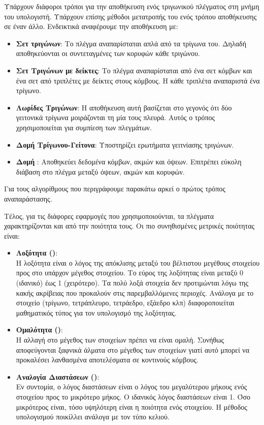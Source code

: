 Υπάρχουν διάφοροι τρόποι για την αποθήκευση ενός τριγωνικού πλέγματος 
στη μνήμη του υπολογιστή. 
Υπάρχουν επίσης μέθοδοι μετατροπής του ενός 
τρόπου αποθήκευσης σε έναν άλλο.
Ενδεικτικά αναφέρουμε την αποθήκευση με:
\begin{itemize}
    \item \textbf{Σετ τριγώνων}: 
    Το πλέγμα αναπαρίσταται απλά από τα τρίγωνα 
    του. 
    Δηλαδή αποθηκεύονται οι συντεταγμένες των κορυφών κάθε τριγώνου.
    \item \textbf{Σετ Τριγώνων με δείκτες}: 
    Το πλέγμα αναπαρίσταται από ένα σετ
    κόμβων και ένα σετ από τριπλέτες με δείκτες στους κόμβους.
    Η κάθε τριπλέτα αναπαριστά ένα τρίγωνο.
    \item \textbf{Λωρίδες Τριγώνων}: 
    Η αποθήκευση αυτή βασίζεται στο γεγονός ότι 
    δύο γειτονικά τρίγωνα μοιράζονται τη μία τους πλευρά. Αυτός 
    ο τρόπος χρησιμοποιείται για συμπίεση των πλεγμάτων.
    \item \textbf{Δομή Τρίγωνου-Γείτονα}: 
    Υποστηρίζει ερωτήματα γειτνίασης τριγώνων.
    \item \textbf{Δομή }: 
    Αποθηκεύει δεδομένα κόμβων, ακμών και όψεων.
    Επιτρέπει εύκολη διάβαση στο πλέγμα μεταξύ όψεων, ακμών και κορυφών.
\end{itemize} 
Για τους αλγορίθμους που περιγράφουμε παρακάτω αρκεί ο πρώτος τρόπος 
αναπαράστασης. 

Τέλος, για τις διάφορες εφαρμογές που χρησιμοποιούνται, τα πλέγματα 
χαρακτηρίζονται και από την ποιότητα τους. Οι πιο συνηθισμένες μετρικές 
ποιότητας είναι:
\begin{itemize}
    \item \textbf{Λοξότητα ()}: \\
    Η λοξότητα είναι ο λόγος της απόκλισης μεταξύ του βέλτιστου μεγέθους
    στοιχείου προς στο υπάρχον μέγεθος στοιχείου. 
    Το εύρος της λοξότητας είναι μεταξύ 0 (ιδανικό) έως 1 (χειρότερο).
    Τα πολύ λοξά στοιχεία δεν προτιμώνται λόγω της κακής ακρίβειας 
    που προκαλούν στις παρεμβαλλόμενες περιοχές.
    Ανάλογα με το στοιχείο (τρίγωνο, τετράπλευρο, τετράεδρο, 
    εξάεδρο κλπ) διαφοροποιείται μαθηματικός τύπος 
    για τον υπολογισμό της λοξότητας.

    \item \textbf{Ομαλότητα ()}: \\
    Η αλλαγή στο μέγεθος των στοιχείων πρέπει να είναι ομαλή. 
    Συνήθως αποφεύγονται ξαφνικά άλματα στο μέγεθος των στοιχείων γιατί αυτό 
    μπορεί να προκαλέσει λανθασμένα αποτελέσματα σε κοντινούς κόμβους.
    
    \item \textbf{Αναλογία Διαστάσεων ()}: \\
    Εν συντομία, ο λόγος διαστάσεων είναι ο λόγος του μεγαλύτερου μήκους 
    ενός στοιχείου προς το μικρότερο μήκος. 
    Ο ιδανικός λόγος διαστάσεων είναι 1. 
    Όσο μικρότερος είναι, τόσο υψηλότερη είναι η ποιότητα ενός στοιχείου. 
    Η μέθοδος υπολογισμού ποικίλλει ανάλογα με τον τύπο κελιού.
\end{itemize}

